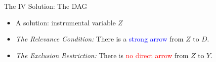 \documentclass[11pt, handout]{beamer}
\begin{document}
\begin{frame}{The IV Solution: The DAG}
    \begin{itemize}
        \item A solution: instrumental variable $Z$
    \end{itemize}
    \vspace{0.8em}
    \begin{center}
    \end{center}
    \vspace{0.8em}
    \begin{itemize}[<+->]
        \item \textit{The Relevance Condition:} There is a \textcolor{blue}{strong arrow} from $Z$ to $D$.
        \vspace{0.8em}
        \item \textit{The Exclusion Restriction:} There is \textcolor{red}{no direct arrow} from $Z$ to $Y$.
    \end{itemize}
\end{frame}
\end{document}
